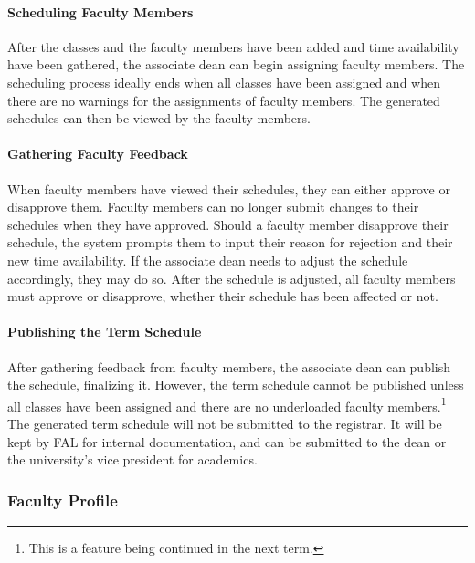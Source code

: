         \paragraph{Scheduling Faculty Members}
        After the classes and the faculty members have been added and time availability have been gathered, the associate dean can begin assigning faculty members. The scheduling process ideally ends when all classes have been assigned and when there are no warnings for the assignments of faculty members. The generated schedules can then be viewed by the faculty members.
        
        \paragraph{Gathering Faculty Feedback}
        When faculty members have viewed their schedules, they can either approve or disapprove them. Faculty members can no longer submit changes to their schedules when they have approved. Should a faculty member disapprove their schedule, the system prompts them to input their reason for rejection and their new time availability. If the associate dean needs to adjust the schedule accordingly, they may do so. After the schedule is adjusted, all faculty members must approve or disapprove, whether their schedule has been affected or not.
        
        \paragraph{Publishing the Term Schedule}
        After gathering feedback from faculty members, the associate dean can publish the schedule, finalizing it. However, the term schedule cannot be published unless all classes have been assigned and there are no underloaded faculty members.\footnote{This is a feature being continued in the next term.} The generated term schedule will not be submitted to the registrar. It will be kept by FAL for internal documentation, and can be submitted to the dean or the university's vice president for academics.

    \subsubsection{Faculty Profile}
